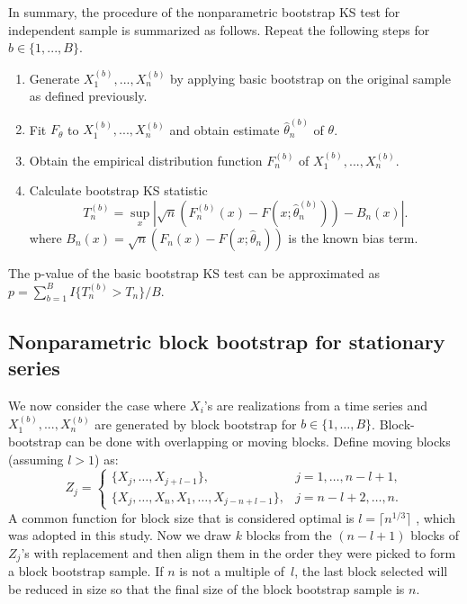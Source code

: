 \documentclass[APA,Times1COL]{WileyNJDv5} %
\begin{document}
In summary, the procedure of the nonparametric bootstrap KS test for independent
sample is 
summarized as follows. Repeat the following steps for $b \in \{1, ..., B\}$.
\begin{enumerate}
\item
  Generate $X^{(b)}_1,...,X^{(b)}_n$ by applying basic bootstrap 
  on the original sample as
  defined previously.
\item
  Fit $F_\theta$ to $X^{(b)}_1,...,X^{(b)}_n$ and obtain estimate 
	$\hat\theta^{(b)}_n$ of $\theta$.
\item
  Obtain the empirical distribution function $F^{(b)}_n$ of
  $X^{(b)}_1,...,X^{(b)}_n$. 
\item
  Calculate bootstrap KS statistic
  \[
    T^{(b)}_n = \sup_x | \sqrt{n}\left(F^{(b)}_n(x) 
    - F(x; \hat\theta^{(b)}_n)\right) - B_n(x) |.
  \]
  where 
  $B_{n}(x) = \sqrt{n}(F_n(x) - F(x; \hat\theta_n))$ is the known
  bias term.
\end{enumerate}


The p-value of the basic bootstrap KS test can be approximated
as $p = \sum_{b=1}^B I\{T^{(b)}_n > T_n\} / B$.


\subsection{Nonparametric block bootstrap for stationary series}

We now consider the case where $X_i$'s are realizations from a time series and
$X^{(b)}_1,...,X^{(b)}_n$ are generated by block bootstrap for 
$b \in \{1, \ldots, B\}$.  
Block-bootstrap can be done with overlapping or moving blocks.
Define moving blocks (assuming $l > 1$) as:
\begin{equation*}
Z_j =
    \begin{cases}
        \{X_j, \ldots, X_{j + l - 1}\}, & j = 1, \dots, n - l + 1,\\
        \{X_j, \ldots, X_n, X_1, \ldots, X_{j-n+l-1}\}, & j = n - l
        + 2 ,\dots, n.
    \end{cases}
\end{equation*}
A common 
function for block size that is considered optimal is 
$l = \lceil n^{1/3} \rceil$ \citep{buhlmann1999block},  
which was adopted in this study.
Now we draw $k$ blocks from the $(n - l + 1)$ blocks 
of $Z_j$'s with replacement and then align them in the order they were picked to
form a block bootstrap sample. If $n$ is not a multiple of~$l$, the last block 
selected will be reduced in size so that the final size of the block bootstrap 
sample is $n$.
\end{document}
